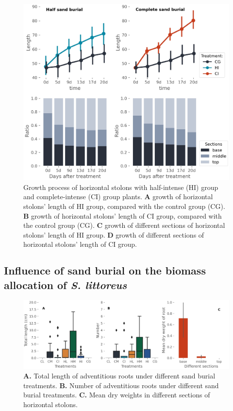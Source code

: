\documentclass[]{interact}
\theoremstyle{plain}%
\theoremstyle{definition}
\theoremstyle{remark}
\begin{document}
\begin{figure}[!h]
  \centering
  \includegraphics[scale=0.7]{../figs/growth_process.jpg}
  \caption{
    Growth process of horizontal stolons with half-intense (HI) group and complete-intense (CI) group plants.
    \textbf{A} growth of horizontal stolons' length of HI group, compared with the control group (CG).
    \textbf{B} growth of horizontal stolons' length of CI group, compared with the control group (CG).
    \textbf{C} growth of different sections of horizontal stolons' length of HI group.
    \textbf{D} growth of different sections of horizontal stolons' length of CI group.
  }
  \label{fig:growth}
\end{figure}


\subsection{Influence of sand burial on the biomass allocation of \textit{S. littoreus}}
\begin{figure}
  \centering
  \includegraphics[scale=0.6]{../figs/roots.jpg}
  \caption{
    \textbf{A.} Total length of adventitious roots under different sand burial treatments.
    \textbf{B.} Number of adventitious roots under different sand burial treatments.
    \textbf{C.} Mean dry weights in different sections of horizontal stolons.
  }
  \label{fig:roots}
\end{figure}
\end{document}
